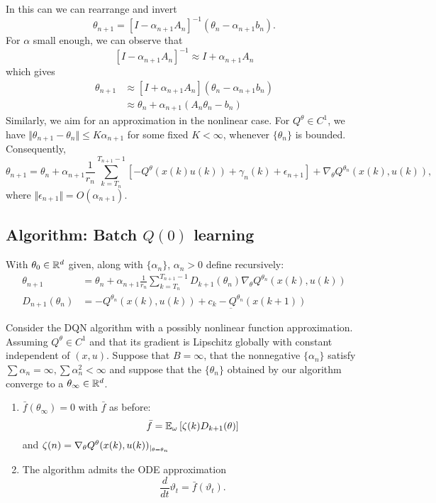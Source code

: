 In this can we can rearrange and invert \[\theta_{n+1}=\left[I-\alpha_{n+1}A_n\right]^{-1}(\theta_n-\alpha_{n+1}b_n).\]
For \(\alpha\) small enough, we can observe that \[\left[I-\alpha_{n+1}A_n\right]^{-1}\approx I+\alpha_{n+1}A_n\]
which gives
\begin{align*}
    \theta_{n+1}&\approx [I+\alpha_{n+1}A_n](\theta_n-\alpha_{n+1}b_n)\\
                &\approx \theta_n+\alpha_{n+1}(A_n\theta_n-b_n)
\end{align*}
Similarly, we aim for  an approximation in the nonlinear case. For \(Q^\theta\in C^1\), we have 
\(\Vert \theta_{n+1}-\theta_n\Vert\leq K \alpha_{n+1}\) for some  fixed \(K<\infty\), whenever \(\{\theta_n\}\)
is bounded. Consequently, \[\theta_{n+1}=\theta_n+\alpha_{n+1}\frac{1}{r_n}\sum_{k=T_n}^{T_{n+1}-1}\left[-Q^\theta(x(k)u(k))+\gamma_n(k)+\epsilon_{n+1}\right]+\nabla_\theta Q^{\theta_n}(x(k),u(k)),\]
where \(\Vert \epsilon_{n+1}\Vert =O(\alpha_{n+1})\).

\subsection{Algorithm: Batch \(Q(0)\) learning }
With \(\theta_0\in \mathbb{R}^d\) given, along with \(\{\alpha_n\}\), \(\alpha_n>0\) define recursively:
\begin{align*}
    \theta_{n+1}&=\theta_n+\alpha_{n+1}\frac{1}{r_n}\sum_{k=T_n}^{T_{n+1}-1} D_{k+1}(\theta_n)\nabla_\theta Q^{\theta_n}(x(k),u(k))\\
    D_{n+1}(\theta_n)&=-Q^{\theta_n}(x(k),u(k))+c_k-\underbar{Q}^{\theta_n}(x(k+1))
\end{align*}

\begin{proposition}\label{prop:52}
    Consider the DQN algorithm with a possibly nonlinear function approximation. Assuming \(Q^\theta\in C^1\) and that its gradient is 
    Lipschitz globally with constant independent of \((x,u)\). Suppose that \(B=\infty\), that the nonnegative \(\{\alpha_n\}\)
    satisfy \(\sum \alpha_n=\infty,\sum \alpha_n^2<\infty\) and suppose that the \(\{\theta_n\}\) obtained by our algorithm
    converge to a \(\theta_\infty\in \mathbb{R}^d\). 
    \begin{enumerate}
        \item \(\bar{f}(\theta_\infty)=0\) with \(\bar{f}\) as before: \[\bar{f}=\mathbb{E}_\omega\left[\zeta(k)D_{k+1}(\theta)\right]\] and \(\zeta(n)=\nabla_\theta Q^\theta(x(k),u(k))_{|_{\theta=\theta_n}}\)
        \item The algorithm admits the ODE approximation \[\frac{d}{dt}\vartheta_t = \bar{f}(\vartheta_t).\]
    \end{enumerate}  
\end{proposition}

